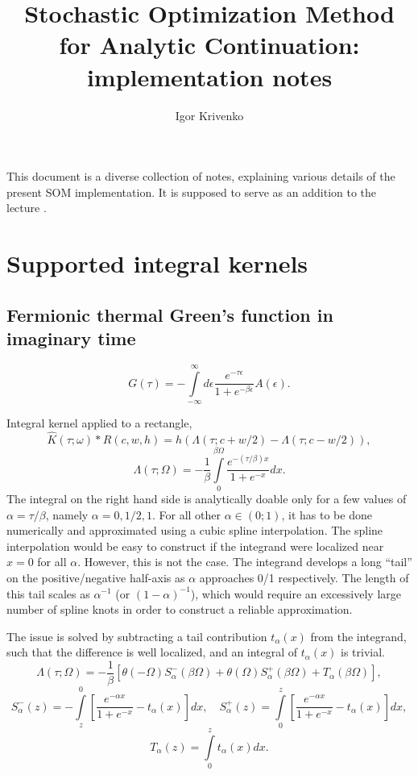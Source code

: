 \documentclass[]{article}
\title{Stochastic Optimization Method for Analytic Continuation: implementation notes}
\author{Igor Krivenko}
\begin{document}
\maketitle

This document is a diverse collection of notes, explaining various details of the present SOM implementation.
It is supposed to serve as an addition to the lecture \cite{som_lecture}.

\section{Supported integral kernels}
\label{kernels}
\subsection{Fermionic thermal Green's function in imaginary time}
\label{fermiongf_imtime}

\begin{equation}
	G(\tau) = -\int\limits_{-\infty}^\infty
	d\epsilon \frac{e^{-\tau\epsilon}}{1+e^{-\beta\epsilon}} A(\epsilon).
\end{equation}

Integral kernel applied to a rectangle,
\begin{equation}
	\hat K(\tau;\omega)*R(c,w,h) =
	h(\Lambda(\tau;c+w/2) - \Lambda(\tau;c-w/2)),
\end{equation}
\begin{equation}
	\Lambda(\tau;\Omega) = -\frac{1}{\beta}
	\int\limits_0^{\beta\Omega}\frac{e^{-(\tau/\beta)x}}{1+e^{-x}}dx.
\end{equation}
The integral on the right hand side is analytically doable only for
a few values of $\alpha=\tau/\beta$, namely $\alpha=0,1/2,1$.
For all other $\alpha\in(0;1)$, it has to be done numerically and approximated using a cubic spline interpolation. The spline interpolation
would be easy to construct if the integrand were localized near $x=0$ for
all $\alpha$. However, this is not the case. The integrand develops
a long ``tail'' on the positive/negative half-axis as $\alpha$ approaches
0/1 respectively. The length of this tail scales as $\alpha^{-1}$ (or $(1-\alpha)^{-1}$), which would require an excessively large number of
spline knots in order to construct a reliable approximation.

The issue is solved by subtracting a tail contribution $t_\alpha(x)$ from the integrand, such that the difference is well localized, and an integral of $t_\alpha(x)$ is trivial.
\begin{equation}
	\Lambda(\tau;\Omega) = -\frac{1}{\beta} \left[
	\theta(-\Omega)S^-_\alpha(\beta\Omega) +
	\theta(\Omega)S^+_\alpha(\beta\Omega) +
	T_\alpha(\beta\Omega)
	\right],
\end{equation}
\begin{equation}
	S^-_\alpha(z) = -\int\limits_z^0
	\left[\frac{e^{-\alpha x}}{1+e^{-x}} - t_\alpha(x)
	\right] dx,\quad
	S^+_\alpha(z) = \int\limits_0^z
	\left[\frac{e^{-\alpha x}}{1+e^{-x}} - t_\alpha(x)
	\right] dx,
\end{equation}
\begin{equation}
	T_\alpha(z) = \int\limits_0^z t_\alpha(x) dx.
\end{equation}
\end{document}
